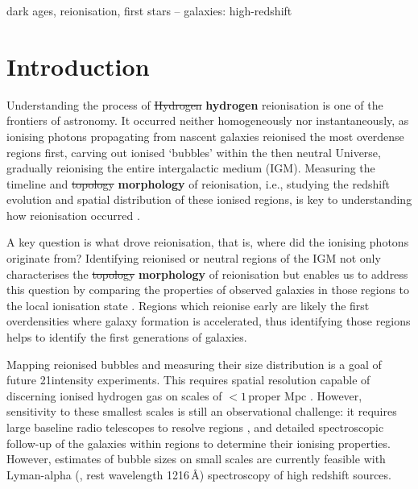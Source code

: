 \documentclass[fleqn,usenatbib]{mnras}
\providecommand{\DIFadd}[1]{{\protect\color{Green} {\bf #1}}} %
\providecommand{\DIFdel}[1]{{\protect\color{Gray} \scriptsize \sout{#1}}} %
\providecommand{\DIFaddbegin}{} %
\providecommand{\DIFaddend}{} %
\providecommand{\DIFdelbegin}{} %
\providecommand{\DIFdelend}{} %
\newcommand{\DIFscaledelfig}{0.5}
\newlength{\DIFdelgraphicswidth} %
\newlength{\DIFdelgraphicsheight} %
\newcommand{\DIFaddincludegraphics}[2][]{{\color{purple}\fbox{\DIFOincludegraphics[#1]{#2}}}} %
\newcommand{\DIFdelincludegraphics}[2][]{%
\sbox{\DIFdelgraphicsbox}{\DIFOincludegraphics[#1]{#2}}%
\settoboxwidth{\DIFdelgraphicswidth}{\DIFdelgraphicsbox} %
\settoboxtotalheight{\DIFdelgraphicsheight}{\DIFdelgraphicsbox} %
\scalebox{\DIFscaledelfig}{%
\parbox[b]{\DIFdelgraphicswidth}{\usebox{\DIFdelgraphicsbox}\\[-\baselineskip] \rule{\DIFdelgraphicswidth}{0em}}\llap{\resizebox{\DIFdelgraphicswidth}{\DIFdelgraphicsheight}{%
\setlength{\unitlength}{\DIFdelgraphicswidth}%
\begin{picture}(1,1)%
\thicklines\linethickness{2pt} %
{\color[rgb]{1,0,0}\put(0,0){\framebox(1,1){}}}%
{\color[rgb]{1,0,0}\put(0,0){\line( 1,1){1}}}%
{\color[rgb]{1,0,0}\put(0,1){\line(1,-1){1}}}%
\end{picture}%
}\hspace*{3pt}}} %
} %
\DeclareRobustCommand{\DIFaddbegin}{\DIFOaddbegin \let\includegraphics\DIFaddincludegraphics} %
\DeclareRobustCommand{\DIFaddend}{\DIFOaddend \let\includegraphics\DIFOincludegraphics} %
\DeclareRobustCommand{\DIFdelbegin}{\DIFOdelbegin \let\includegraphics\DIFdelincludegraphics} %
\DeclareRobustCommand{\DIFdelend}{\DIFOaddend \let\includegraphics\DIFOincludegraphics} %
\begin{document}
\begin{keywords}
dark ages, reionisation, first stars -- galaxies: high-redshift
\end{keywords}



\section{Introduction}
\label{sec:intro}

Understanding the process of \DIFdelbegin \DIFdel{Hydrogen }\DIFdelend \DIFaddbegin \DIFadd{hydrogen }\DIFaddend reionisation is one of the frontiers of astronomy. 
It occurred neither homogeneously nor instantaneously, as ionising photons propagating from nascent galaxies reionised the most overdense regions first, carving out ionised `bubbles' within the then neutral Universe, gradually reionising the entire intergalactic medium (IGM). Measuring the timeline and \DIFdelbegin \DIFdel{topology }\DIFdelend \DIFaddbegin \DIFadd{morphology }\DIFaddend of reionisation, i.e., studying the redshift evolution and spatial distribution of these ionised regions, is key to understanding how reionisation occurred \citep[e.g.,][]{Furlanetto2004a,McQuinn2007,Mesinger2016a}.

A key question is what drove reionisation, that is, where did the ionising photons originate from?
Identifying reionised or neutral regions of the IGM not only characterises the \DIFdelbegin \DIFdel{topology }\DIFdelend \DIFaddbegin \DIFadd{morphology }\DIFaddend of reionisation but enables us to address this question by comparing the properties of observed galaxies in those regions to the local ionisation state \citep[e.g.,][]{Beardsley2015a}. Regions which reionise early are likely the first overdensities where galaxy formation is accelerated, thus identifying those regions helps to identify the first generations of galaxies.

Mapping reionised bubbles and measuring their size distribution is a goal of future 21\cm intensity experiments. This requires spatial resolution capable of discerning ionised hydrogen gas on scales of $<1$\,proper Mpc \citep[e.g.,][]{Geil2017}. However, sensitivity to these smallest scales is still an observational challenge: it requires large baseline radio telescopes to resolve \HI regions \citep[e.g., SKA-low,][]{Koopmans2015}, and detailed spectroscopic follow-up of the galaxies within \HII regions to determine their ionising properties. However, estimates of bubble sizes on small scales are currently feasible with Lyman-alpha (\lya, rest wavelength 1216\,\AA) spectroscopy of high redshift sources.
\end{document}
